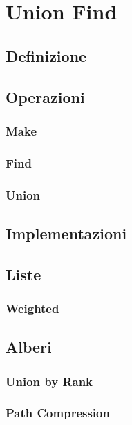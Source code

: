 
\chapter{Union Find}

\section{Definizione}
\section{Operazioni}
\subsection{Make}
\subsection{Find}
\subsection{Union}
\section{Implementazioni}
\section{Liste}
\subsection{Weighted}
\section{Alberi}
\subsection{Union by Rank}
\subsection{Path Compression}